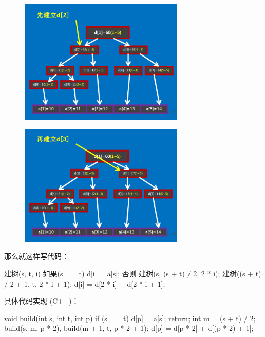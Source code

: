 \begin{figure}[htbp]
\centering
\includegraphics[width=0.7\textwidth]{docs/ds/images/segt3.png} 

\end{figure}

\begin{figure}[htbp]
\centering
\includegraphics[width=0.7\textwidth]{docs/ds/images/segt4.png} 

\end{figure}

那么就这样写代码：

\begin{cppcode}
建树(s, t, i) {
  如果(s == t) { d[i] = a[s]; }
  否则 {
    建树(s, (s + t) / 2, 2 * i);
    建树((s + t) / 2 + 1, t, 2 * i + 1);
    d[i] = d[2 * i] + d[2 * i + 1];
  }
}
\end{cppcode}

具体代码实现 (C++)：

\begin{cppcode}
void build(int s, int t, int p) {
  if (s == t) {
    d[p] = a[s];
    return;
  }
  int m = (s + t) / 2;
  build(s, m, p * 2), build(m + 1, t, p * 2 + 1);
  d[p] = d[p * 2] + d[(p * 2) + 1];
}
\end{cppcode}


